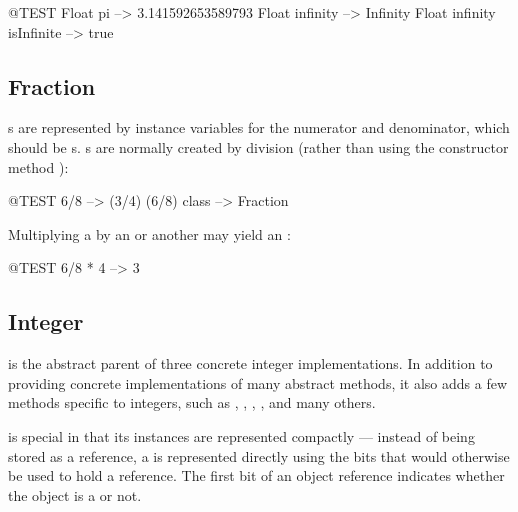 \documentclass[a4paper,10pt,twoside]{book}
\begin{document}
\begin{code}{@TEST}
Float pi                      --> 3.141592653589793
Float infinity               --> Infinity
Float infinity isInfinite --> true
\end{code}

\subsection{Fraction}

s are represented by instance variables for the numerator and denominator, which should be s.
s are normally created by  division (rather than using the constructor method ):

\begin{code}{@TEST}
6/8             --> (3/4)
(6/8) class --> Fraction
\end{code}

Multiplying a  by an  or another  may yield an :

\begin{code}{@TEST}
6/8 * 4 --> 3
\end{code}


\subsection{Integer}

 is the abstract parent of three concrete integer implementations.
In addition to providing concrete implementations of many abstract  methods, it also adds a few methods specific to integers, such as , , , , and many others.

 is special in that its instances are represented compactly --- instead of being stored as a reference, a  is represented directly using the bits that would otherwise be used to hold a reference.
The first bit of an object reference indicates whether the object is a  or not.
\end{document}
